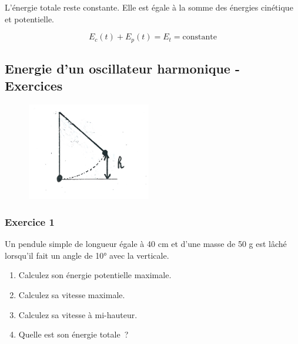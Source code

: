 L'énergie totale reste constante. Elle est égale à la somme des énergies
cinétique et potentielle.

\[E_{c}{{(t)} + E_{p}}{{(t)} = E_{t} = \text{constante}}\]

\hypertarget{energie-dun-oscillateur-harmonique---exercices}{%
\subsection[Energie d'un oscillateur harmonique -
Exercices]{\texorpdfstring{\protect\hypertarget{anchor-6}{}{}Energie
d'un oscillateur harmonique -
Exercices}{Energie d'un oscillateur harmonique - Exercices}}\label{energie-dun-oscillateur-harmonique---exercices}}

\begin{figure}
\centering
\includegraphics[width=5.457cm,height=4.239cm]{Pictures/1000000100000255000001D4999CDF6CC98F91D9.png}
\caption{}
\end{figure}

\hypertarget{exercice-1}{%
\subsubsection[Exercice
1]{\texorpdfstring{\protect\hypertarget{anchor-7}{}{}Exercice
1}{Exercice 1}}\label{exercice-1}}

Un pendule simple de longueur égale à 40 cm et d'une masse de 50 g est
lâché lorsqu'il fait un angle de 10° avec la verticale.

\begin{enumerate}
\def\labelenumi{\arabic{enumi}.}
\tightlist
\item
  Calculez son énergie potentielle maximale.
\item
  Calculez sa vitesse maximale.
\item
  Calculez sa vitesse à mi-hauteur.
\item
  Quelle est son énergie totale~?
\end{enumerate}

